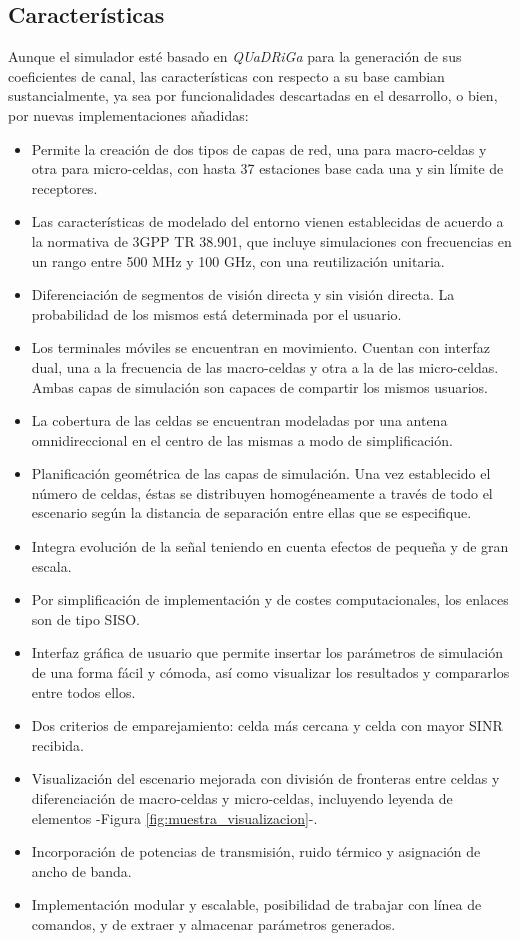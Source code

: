 \subsection{Características}

Aunque el simulador esté basado en \textit{QUaDRiGa} para la generación de sus coeficientes de canal, las características con respecto a su base cambian sustancialmente, ya sea por funcionalidades descartadas en el desarrollo, o bien, por nuevas implementaciones añadidas:

\begin{itemize}
    \item Permite la creación de dos tipos de capas de red, una para macro-celdas y otra para micro-celdas, con hasta 37 estaciones base cada una y sin límite de receptores.
    \item Las características de modelado del entorno vienen establecidas de acuerdo a la normativa de 3GPP TR 38.901, que incluye simulaciones con frecuencias en un rango entre 500 MHz y 100 GHz, con una reutilización unitaria.
    \item Diferenciación de segmentos de visión directa y sin visión directa. La probabilidad de los mismos está determinada por el usuario.
    \item Los terminales móviles se encuentran en movimiento. Cuentan con interfaz dual, una a la frecuencia de las macro-celdas y otra a la de las micro-celdas. Ambas capas de simulación son capaces de compartir los mismos usuarios.
    \item La cobertura de las celdas se encuentran modeladas por una antena omnidireccional en el centro de las mismas a modo de simplificación.
    \item Planificación geométrica de las capas de simulación. Una vez establecido el número de celdas, éstas se distribuyen homogéneamente a través de todo el escenario según la distancia de separación entre ellas que se especifique.
    \item Integra evolución de la señal teniendo en cuenta efectos de pequeña y de gran escala.
    \item Por simplificación de implementación y de costes computacionales, los enlaces son de tipo SISO.
    \item Interfaz gráfica de usuario que permite insertar los parámetros de simulación de una forma fácil y cómoda, así como visualizar los resultados y compararlos entre todos ellos.
    \item Dos criterios de emparejamiento: celda más cercana y celda con mayor SINR recibida.
    \item Visualización del escenario mejorada con división de fronteras entre celdas y diferenciación de macro-celdas y micro-celdas, incluyendo leyenda de elementos -Figura \ref{fig:muestra_visualizacion}-.
    \item Incorporación de potencias de transmisión, ruido térmico y asignación de ancho de banda.
    \item Implementación modular y escalable, posibilidad de trabajar con línea de comandos, y de extraer y almacenar parámetros generados.
\end{itemize}

